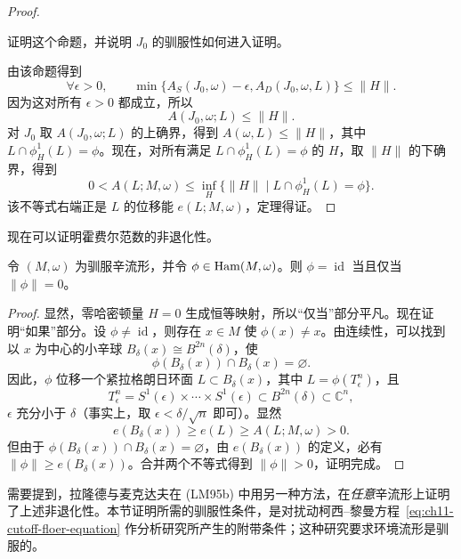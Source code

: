 \begin{proof}
\begin{exercise}\label{ex:ch11-tameness-upper-semicontinuity}
证明这个命题，并说明 $J_0$ 的驯服性如何进入证明。
\end{exercise}

由该命题得到
\[
 \forall\epsilon>0,\qquad
 \min\{A_S(J_0,\omega)-\epsilon,A_D(J_0,\omega,L)\}
 \leq\lVert H\rVert.
\]
因为这对所有 $\epsilon>0$ 都成立，所以
\[
 A(J_0,\omega;L)\leq\lVert H\rVert.
\]
对 $J_0$ 取 $A(J_0,\omega;L)$ 的上确界，得到
$A(\omega,L)\leq\lVert H\rVert$，其中
$L\cap\phi_H^1(L)=\phi$。现在，对所有满足
$L\cap\phi_H^1(L)=\phi$ 的 $H$，取 $\lVert H\rVert$ 的下确界，得到
\[
 0<A(L;M,\omega)
 \leq\inf_H\{\lVert H\rVert\mid L\cap\phi_H^1(L)=\phi\}.
\]
该不等式右端正是 $L$ 的位移能 $e(L;M,\omega)$，定理得证。
\end{proof}

现在可以证明霍费尔范数的非退化性。

\begin{theorem}\label{thm:ch11-hofer-norm-nondegenerate}
令 $(M,\omega)$ 为驯服辛流形，并令 $\phi\in\operatorname{Ham}(M,\omega)$。则
$\phi=\operatorname{id}$ 当且仅当 $\lVert\phi\rVert=0$。
\end{theorem}

\begin{proof}
显然，零哈密顿量 $H=0$ 生成恒等映射，所以“仅当”部分平凡。现在证明“如果”部分。设 $\phi\ne\operatorname{id}$，则存在 $x\in M$ 使
$\phi(x)\ne x$。由连续性，可以找到以 $x$ 为中心的小辛球
$B_\delta(x)\cong B^{2n}(\delta)$，使
\[
 \phi(B_\delta(x))\cap B_\delta(x)=\varnothing.
\]
因此，$\phi$ 位移一个紧拉格朗日环面
$L\subset B_\delta(x)$，其中 $L=\phi(T_\epsilon^n)$，且
\[
 T_\epsilon^n
 =S^1(\epsilon)\times\cdots\times S^1(\epsilon)
 \subset B^{2n}(\delta)\subset\mathbb C^n,
\]
$\epsilon$ 充分小于 $\delta$（事实上，取
$\epsilon<\delta/\sqrt n$ 即可）。显然
\[
 e(B_\delta(x))\geq e(L)\geq A(L;M,\omega)>0.
\]
但由于 $\phi(B_\delta(x))\cap B_\delta(x)=\varnothing$，由
$e(B_\delta(x))$ 的定义，必有
$\lVert\phi\rVert\geq e(B_\delta(x))$。合并两个不等式得到
$\lVert\phi\rVert>0$，证明完成。
\end{proof}

\begin{remark}\label{rem:ch11-lalonde-mcduff-arbitrary-symplectic}
需要提到，拉隆德与麦克达夫在 (LM95b) 中用另一种方法，在\emph{任意}辛流形上证明了上述非退化性。本节证明所需的驯服性条件，是对扰动柯西--黎曼方程~\eqref{eq:ch11-cutoff-floer-equation} 作分析研究所产生的附带条件；这种研究要求环境流形是驯服的。
\end{remark}

